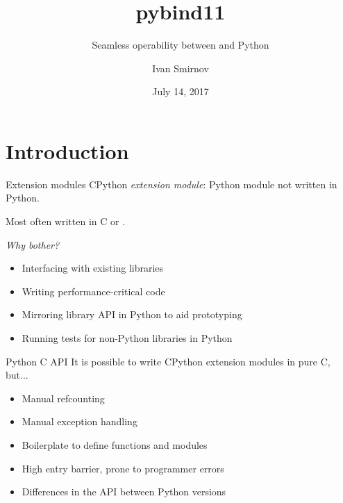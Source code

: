 \documentclass[10pt]{beamer}
\title{pybind11}
\subtitle{Seamless operability between \texorpdfstring{\cpp{11}}{C++11} and Python}
\date{July 14, 2017}
\author{Ivan Smirnov}
\institute{Susquehanna International Group\\
[6\baselineskip]{euro\textbf{python} 2017}}
\newcommand\cpp[1]{\cpluspluslogo #1}
\begin{document}
\maketitle


\section{Introduction}


\begin{frame}{Extension modules}
    CPython \textit{extension module}: Python module not written in Python.

    \pause

    Most often written in C or \cpp{}.

    \pause

    \hrulefill

    \textit{Why bother?}

    \begin{itemize}
        \item \pause Interfacing with existing libraries
        \item \pause Writing performance-critical code
        \item \pause Mirroring library API in Python to aid prototyping
        \item \pause Running tests for non-Python libraries in Python
    \end{itemize}
\end{frame}


\begin{frame}{Python C API}
    It is possible to write CPython extension modules in pure C, but...

    \begin{itemize}
        \item \pause Manual refcounting
        \item \pause Manual exception handling
        \item \pause Boilerplate to define functions and modules
        \item \pause High entry barrier, prone to programmer errors
        \item \pause Differences in the API between Python versions
    \end{itemize}
\end{frame}
\end{document}
